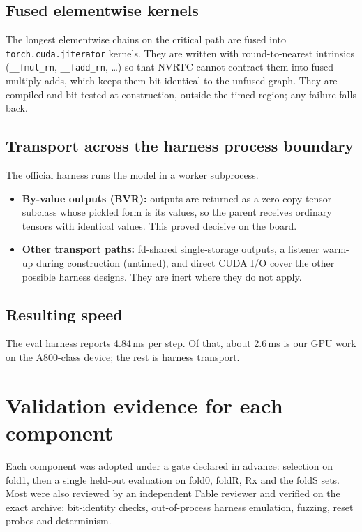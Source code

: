 \documentclass[10pt]{article}
\newcommand{\cfg}[1]{\texttt{#1}}
\begin{document}
\subsection{Fused elementwise kernels}
The longest elementwise chains on the critical path are fused into \cfg{torch.cuda.jiterator} kernels. They are
written with round-to-nearest intrinsics (\cfg{\_\_fmul\_rn}, \cfg{\_\_fadd\_rn}, \dots) so that NVRTC cannot
contract them into fused multiply-adds, which keeps them bit-identical to the unfused graph. They are compiled
and bit-tested at construction, outside the timed region; any failure falls back.

\subsection{Transport across the harness process boundary}
The official harness runs the model in a worker subprocess.
\begin{itemize}
\item \textbf{By-value outputs (BVR):} outputs are returned as a zero-copy tensor subclass whose pickled form is
  its values, so the parent receives ordinary tensors with identical values. This proved decisive on the board.
\item \textbf{Other transport paths:} fd-shared single-storage outputs, a listener warm-up during construction
  (untimed), and direct CUDA I/O cover the other possible harness designs. They are inert where they do not
  apply.
\end{itemize}

\subsection{Resulting speed}
The eval harness reports 4.84\,ms per step. Of that, about 2.6\,ms is our GPU work on the A800-class device;
the rest is harness transport.

\section{Validation evidence for each component}

Each component was adopted under a gate declared in advance: selection on fold1, then a single held-out
evaluation on fold0, foldR, Rx and the foldS sets. Most were also reviewed by an independent Fable reviewer and
verified on the exact archive: bit-identity checks, out-of-process harness emulation, fuzzing, reset probes and
determinism.
\end{document}
